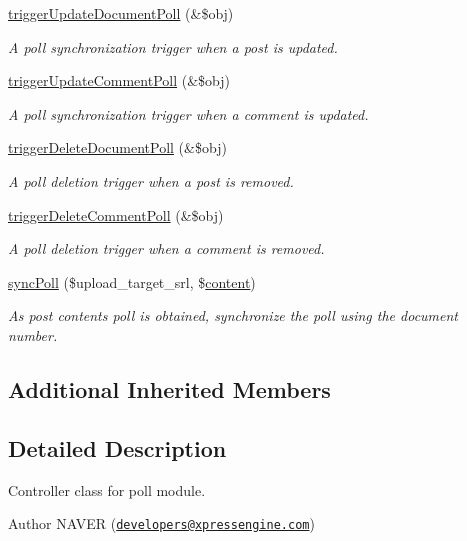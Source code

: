 \begin{DoxyCompactItemize}
\hyperlink{classpollController_a20c5267c985ebf4484a61b238850f0c5}{trigger\+Update\+Document\+Poll} (\&\$obj)
\begin{DoxyCompactList}\small\item\em A poll synchronization trigger when a post is updated. \end{DoxyCompactList}\item 
\hyperlink{classpollController_a2f3da10fbc7dc8bf7dddaf0e81e152ab}{trigger\+Update\+Comment\+Poll} (\&\$obj)
\begin{DoxyCompactList}\small\item\em A poll synchronization trigger when a comment is updated. \end{DoxyCompactList}\item 
\hyperlink{classpollController_ac74ea74fb486787ce4c6c3c9fe3a91da}{trigger\+Delete\+Document\+Poll} (\&\$obj)
\begin{DoxyCompactList}\small\item\em A poll deletion trigger when a post is removed. \end{DoxyCompactList}\item 
\hyperlink{classpollController_abd194582f292d00b57a524453ef256d3}{trigger\+Delete\+Comment\+Poll} (\&\$obj)
\begin{DoxyCompactList}\small\item\em A poll deletion trigger when a comment is removed. \end{DoxyCompactList}\item 
\hyperlink{classpollController_a9a22d9c1e70e7fdf3d635cc4e02fe8f7}{sync\+Poll} (\$upload\+\_\+target\+\_\+srl, \$\hyperlink{classcontent}{content})
\begin{DoxyCompactList}\small\item\em As post content\textquotesingle{}s poll is obtained, synchronize the poll using the document number. \end{DoxyCompactList}\end{DoxyCompactItemize}
\subsection*{Additional Inherited Members}


\subsection{Detailed Description}
Controller class for poll module. 

\begin{DoxyAuthor}{Author}
N\+A\+V\+ER (\href{mailto:developers@xpressengine.com}{\tt developers@xpressengine.\+com}) 
\end{DoxyAuthor}


